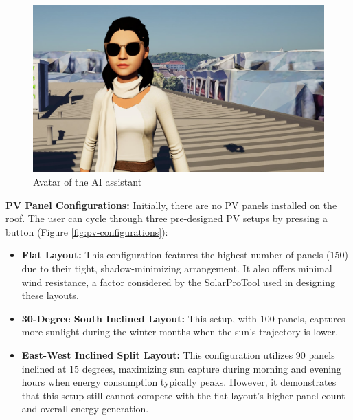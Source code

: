 \documentclass[draft, final]{vutinfth} %
\begin{document}
\begin{figure}
    \centering
    \includegraphics[width=\textwidth]{graphics/ai.jpg}
    \caption{Avatar of the AI assistant}
    \label{fig:ai-avatar}
\end{figure}

\textbf{PV Panel Configurations:} Initially, there are no PV panels installed on the roof. The user can cycle through three pre-designed PV setups by pressing a button (Figure \ref{fig:pv-configurations}):

\begin{itemize}
    \item \textbf{Flat Layout:} This configuration features the highest number of panels (150) due to their tight, shadow-minimizing arrangement. It also offers minimal wind resistance, a factor considered by the SolarProTool used in designing these layouts.
    \item \textbf{30-Degree South Inclined Layout:} This setup, with 100 panels, captures more sunlight during the winter months when the sun's trajectory is lower.
    \item \textbf{East-West Inclined Split Layout:} This configuration utilizes 90 panels inclined at 15 degrees, maximizing sun capture during morning and evening hours when energy consumption typically peaks. However, it demonstrates that this setup still cannot compete with the flat layout's higher panel count and overall energy generation.
\end{itemize}
\end{document}
